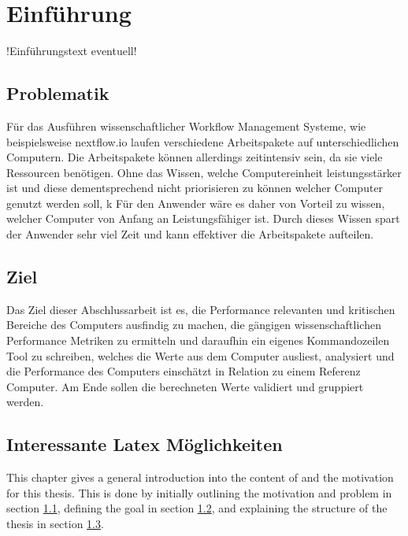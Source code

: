 
\cleardoublepage
\chapter{Einführung}
\label{cha:introduction}

!Einführungstext eventuell!

\section{Problematik}
\label{sec:motivation}

Für das Ausführen wissenschaftlicher Workflow Management Systeme, wie beispielsweise nextflow.io laufen verschiedene Arbeitspakete auf unterschiedlichen Computern. Die Arbeitspakete können allerdings zeitintensiv sein, da sie viele Ressourcen benötigen.
 Ohne das Wissen, welche Computereinheit leistungsstärker ist und diese dementsprechend nicht priorisieren zu können welcher Computer genutzt werden soll, k
Für den Anwender wäre es daher von Vorteil zu wissen, welcher Computer von Anfang an Leistungsfähiger ist. Durch dieses Wissen spart der Anwender sehr viel Zeit und kann effektiver die Arbeitspakete aufteilen.


\section{Ziel}
\label{sec:goal}

Das Ziel dieser Abschlussarbeit ist es, die Performance relevanten und kritischen Bereiche des Computers ausfindig zu machen, die gängigen wissenschaftlichen Performance Metriken zu ermitteln und daraufhin ein eigenes Kommandozeilen Tool zu schreiben, welches die Werte aus dem Computer ausliest, analysiert und die Performance des Computers einschätzt in Relation zu einem Referenz Computer. Am Ende sollen die berechneten Werte validiert und gruppiert werden.



\section{Interessante Latex Möglichkeiten}
\label{sec:structure}

This chapter gives a general introduction into the content of and the motivation for this thesis. This is done by initially outlining the motivation and problem in section \ref{sec:motivation}, defining the goal in section \ref{sec:goal}, and explaining the structure of the thesis in section \ref{sec:structure}.


